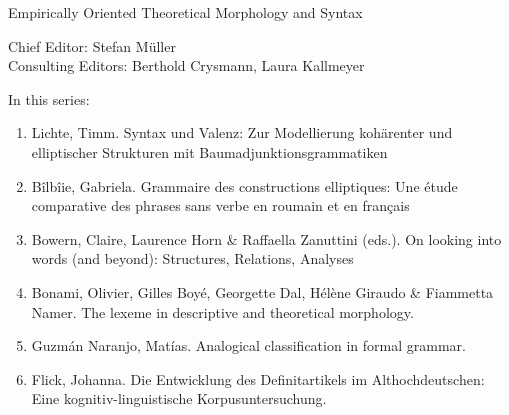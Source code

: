 {\large Em­pir­i­cal­ly Ori­ent­ed The­o­ret­i­cal Mor­phol­o­gy and Syn­tax}

\bigskip

Chief Editor: Stefan Müller \\
Consulting Editors: Berthold Crysmann, Laura Kallmeyer

\bigskip

In this series:

\begin{enumerate}
\item Lichte, Timm. Syntax und Valenz: Zur Modellierung kohärenter und elliptischer Strukturen mit Baumadjunktionsgrammatiken 
\item Bîlbîie, Gabriela. Grammaire des constructions elliptiques: Une étude comparative des phrases sans verbe en roumain et en français 
\item Bowern, Claire, Laurence Horn \& Raffaella Zanuttini (eds.). On looking into words (and beyond): Structures, Relations, Analyses
\item Bonami, Olivier, Gilles Boyé, Georgette Dal, Hélène Giraudo \& Fiammetta Namer. The lexeme in descriptive and theoretical morphology.
\item Guzmán Naranjo, Matías. Analogical classification in formal grammar.
\item Flick, Johanna. Die Entwicklung des Definitartikels im Althochdeutschen: Eine kognitiv-linguistische Korpusuntersuchung.
\end{enumerate}
